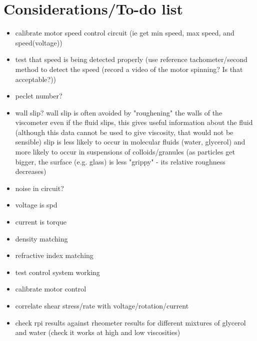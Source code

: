 \documentclass[a4]{report}
\begin{document}
	\chapter{Considerations/To-do list}
	\begin{itemize}
		\item calibrate motor speed control circuit (ie get min speed, max speed, and speed(voltage))
		\item test that speed is being detected properly (use reference tachometer/second method to detect the speed (record a video of the motor spinning? Is that acceptable?))
		\item peclet number?
		\item wall slip?
		\subitem wall slip is often avoided by "roughening" the walls of the viscometer
		\subitem even if the fluid slips, this gives useful information about the fluid (although this data cannot be used to give viscosity, that would not be sensible)
		\subitem slip is less likely to occur in molecular fluids (water, glycerol) and more likely to occur in suspensions of colloids/granules (as particles get bigger, the surface (e.g. glass) is less "grippy" - its relative roughness decreases)
		\item noise in circuit?
		\item voltage is spd
		\item current is torque
		\item density matching
		\item refractive index matching
		\item test control system working
		\item calibrate motor control
		\item correlate shear stress/rate with voltage/rotation/current
		\item check rpi results against rheometer results for different mixtures of glycerol and water (check it works at high and low viscosities)
	\end{itemize}
	
\end{document}
